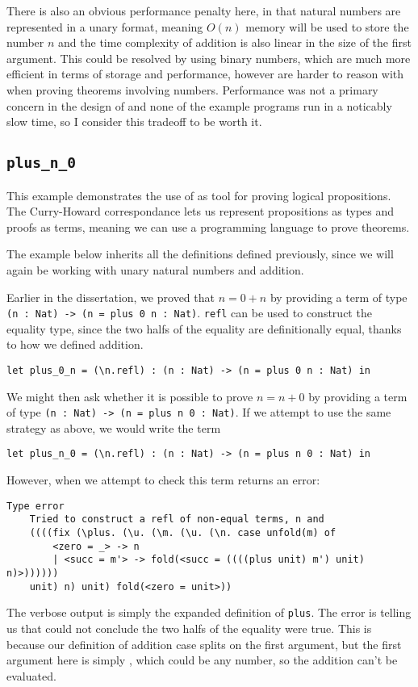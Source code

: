 \documentclass[12pt,a4paper,twoside]{report}
\begin{document}
There is also an obvious performance penalty here, in that natural numbers are represented in a unary format, meaning \(O(n)\) memory will be used to store the number \(n\) and the time complexity of addition is also linear in the size of the first argument.
This could be resolved by using binary numbers, which are much more efficient in terms of storage and performance, however are harder to reason with when proving theorems involving numbers.
Performance was not a primary concern in the design of \pimu{} and none of the example programs run in a noticably slow time, so I consider this tradeoff to be worth it.

\subsection{\texttt{plus\_n\_0}}

This example demonstrates the use of \pimu{} as tool for proving logical propositions.
The Curry-Howard correspondance \cite{howard80} lets us represent propositions as types and proofs as terms, meaning we can use a programming language to prove theorems.

The example below inherits all the definitions defined previously, since we will again be working with unary natural numbers and addition.

Earlier in the dissertation, we proved that \(n = 0 + n\) by providing a term of type \lstinline{(n : Nat) -> (n = plus 0 n : Nat)}.
\texttt{refl} can be used to construct the equality type, since the two halfs of the equality are definitionally equal, thanks to how we defined addition.
\begin{lstlisting}[gobble=4]
    let plus_0_n = (\n.refl) : (n : Nat) -> (n = plus 0 n : Nat) in
\end{lstlisting}

We might then ask whether it is possible to prove \(n = n + 0\) by providing a term of type \lstinline{(n : Nat) -> (n = plus n 0 : Nat)}.
If we attempt to use the same strategy as above, we would write the term
\begin{lstlisting}[gobble=4]
    let plus_n_0 = (\n.refl) : (n : Nat) -> (n = plus n 0 : Nat) in
\end{lstlisting}
However, when we attempt to check this term \pimu{} returns an error:
\begin{lstlisting}[gobble=4]
    Type error
    Tried to construct a refl of non-equal terms, n and
    ((((fix (\plus. (\u. (\m. (\u. (\n. case unfold(m) of 
        <zero = _> -> n
        | <succ = m'> -> fold(<succ = ((((plus unit) m') unit) n)>)))))) 
    unit) n) unit) fold(<zero = unit>))
\end{lstlisting}
The verbose output is simply the expanded definition of \texttt{plus}.
The error is telling us that \pimu{} could not conclude the two halfs of the equality were true.
This is because our definition of addition case splits on the first argument, but the first argument here is simply , which could be any number, so the addition can't be evaluated.
\end{document}
